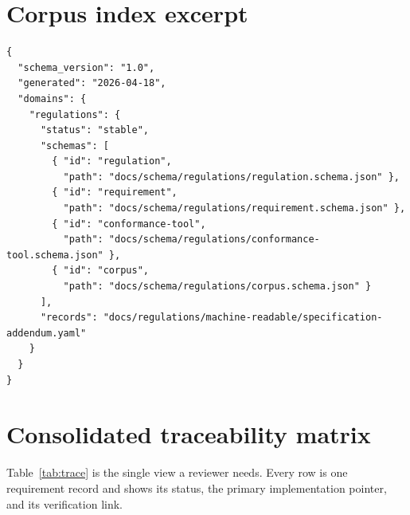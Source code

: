 \section{Corpus index excerpt}

\begin{lstlisting}[language=jsonx,caption={Excerpt of \texttt{docs/schema/registry.json} (regulations domain).}]
{
  "schema_version": "1.0",
  "generated": "2026-04-18",
  "domains": {
    "regulations": {
      "status": "stable",
      "schemas": [
        { "id": "regulation",
          "path": "docs/schema/regulations/regulation.schema.json" },
        { "id": "requirement",
          "path": "docs/schema/regulations/requirement.schema.json" },
        { "id": "conformance-tool",
          "path": "docs/schema/regulations/conformance-tool.schema.json" },
        { "id": "corpus",
          "path": "docs/schema/regulations/corpus.schema.json" }
      ],
      "records": "docs/regulations/machine-readable/specification-addendum.yaml"
    }
  }
}
\end{lstlisting}

\section{Consolidated traceability matrix}

Table~\ref{tab:trace} is the single view a reviewer needs. Every row is
one requirement record and shows its status, the primary implementation
pointer, and its verification link.

